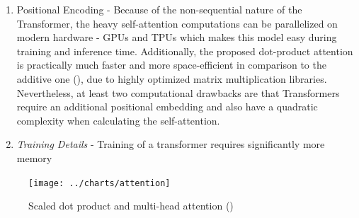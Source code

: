 \begin{enumerate}
\begin{itemize}
        \begin{figure}
            \begin{equation}
                \text{Attention}(Q, K, V) = \text{softmax}\left(\frac{QK^T}{\sqrt{d_k}}\right)V\label{eq:equation2}
            \end{equation}
            \caption{Attention calculation (Query, Key, Value)}
            \label{fig:attention}
        \end{figure}

        \item The multi-head attention (\cite{vaswani2017attention}) is a mechanism that allows the Transformer to learn multiple representations of the input sequence.
        This is achieved by stacking multiple attention heads (each with its own $Q$, $K$, $V$ matrices) and concatenating their outputs (Figure~\ref{fig:attention_dot_product}).
        For each head $h_i$, the $Q$, $K$, and $V$ vectors will be linearly projected with different weight matrices $W_i^Q$, $W_i^K$, and $W_i^V$, respectively.
        The intuition is that each attention head learns different aspects of the relationships that exist among inputs (e.g., syntactic, semantic, and discourse relationships~\cite{jurafsky2000}) and the concatenation of the different representations allows the Transformer to learn a richer overall representation of the input sequence.

    \end{itemize}
    \item Positional Encoding - Because of the non-sequential nature of the Transformer, the heavy self-attention computations can be parallelized on modern hardware - GPUs and TPUs which makes this model easy during training and inference time.
    Additionally, the proposed dot-product attention is practically much faster and more space-efficient in comparison to the additive one (\cite{bahdanau2016neural}), due to highly optimized matrix multiplication libraries.
    Nevertheless, at least two computational drawbacks are that Transformers require an additional positional embedding and also have a quadratic complexity when calculating the self-attention.
    \item \emph{Training Details} - Training of a transformer requires significantly more memory
\end{enumerate}

\begin{figure}[ht]
    \centering
    \texttt{[image: ../charts/attention]}~\caption{Scaled dot product and multi-head attention (\cite{vaswani2017attention})}
    \label{fig:attention_dot_product}
\end{figure}


